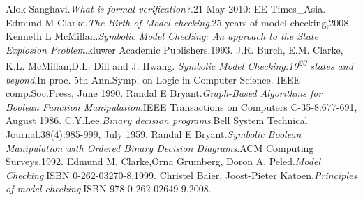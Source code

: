 \documentclass[12pt]{report}
\begin{document}
\begin{thebibliography}{99}
 Alok Sanghavi.\textit{What is formal verification?}.21 May 2010: EE Times\_Asia.
 Edmund M Clarke.\textit{The Birth of Model checking}.25 years of model checking,2008.
 Kenneth L McMillan.\textit{Symbolic Model Checking: An approach to the State Explosion Problem}.kluwer Academic Publishers,1993.
 J.R. Burch, E.M. Clarke, K.L. McMillan,D.L. Dill and J. Hwang. \textit{Symbolic Model Checking:10\textsuperscript{20} states and beyond}.In proc. 5th Ann.Symp. on Logic in Computer Science. IEEE comp.Soc.Press, June 1990.
 Randal E Bryant.\textit{Graph-Based Algorithms for Boolean Function Manipulation}.IEEE Transactions on Computers C-35-8:677-691, August 1986.
 C.Y.Lee.\textit{Binary decision programs}.Bell System Technical Journal.38(4):985-999, July 1959.
 Randal E Bryant.\textit{Symbolic Boolean Manipulation with Ordered Binary Decision Diagrams}.ACM Computing Surveys,1992.
Edmund M. Clarke,Orna Grumberg, Doron A. Peled.\textit{Model Checking}.ISBN 0-262-03270-8,1999.
 Christel Baier, Joost-Pieter Katoen.\textit{Principles of model checking}.ISBN 978-0-262-02649-9,2008.
\end{thebibliography}
\end{document}
